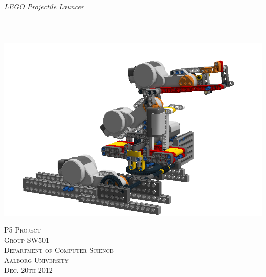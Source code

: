 \thispagestyle{empty}
\begin{flushright}
\vspace{3cm}

\phantom{hul}

\phantom{hul}

\phantom{hul}

\textsl{\Huge LEGO Projectile Launcer} \\ \vspace{1cm}

\rule{13cm}{3mm} \\ \vspace{1.5cm}
\vspace{1cm}

\includegraphics[width=1.0\textwidth]{img/design_turret4} 

\vspace{1.5cm} 
\textsc{\Large P5 Project \\
Group SW501 \\
Department of Computer Science\\
Aalborg University\\
Dec. 20th 2012\\}
\end{flushright}
